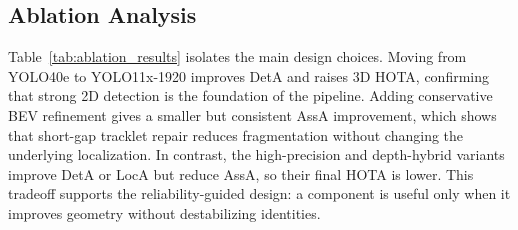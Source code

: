\documentclass[runningheads]{llncs}
\begin{document}
\begin{table}[t]
\caption{Official Track 1 results for our main submissions. All values are
percentages. The best result is shown in bold.}
\label{tab:main_results}
\centering
{}
\end{table}

\subsection{Ablation Analysis}
\label{sec:exp_ablation}

Table~\ref{tab:ablation_results} isolates the main design choices. Moving from
YOLO40e to YOLO11x-1920 improves DetA and raises 3D HOTA, confirming that strong
2D detection is the foundation of the pipeline. Adding
conservative BEV refinement gives a smaller but consistent AssA improvement, which
shows that short-gap tracklet repair reduces fragmentation without changing the
underlying localization. In contrast, the high-precision and depth-hybrid
variants improve DetA or LocA but reduce AssA, so their final HOTA is lower. This
tradeoff supports the reliability-guided design: a component is useful only when
it improves geometry without destabilizing identities.
\end{document}
